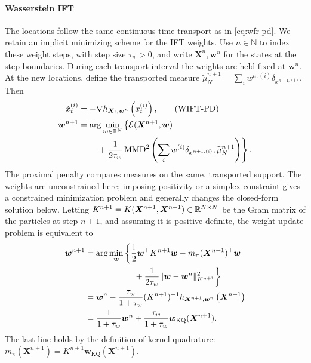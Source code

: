 \paragraph{Wasserstein IFT} 
The locations follow the same continuous-time transport as in \eqref{eq:wfr-pd}. We retain an implicit minimizing scheme for the IFT weights. Use $n\in\mathbb{N}$ to index these weight steps, with step size $\tau_w>0$, and write $\bm{X}^n,\bm{w}^n$ for the states at the step boundaries. During each transport interval the weights are held fixed at $\bm{w}^n$. At the new locations, define the transported measure $\widetilde\mu_N^{n+1}=\sum_iw^{n,(i)}\delta_{x^{n+1,(i)}}$. Then
\begin{align*}\label{eq:wift-pd}
    \dot{x}_t^{(i)}
    &=-\nabla h_{\bm{X}_t,\bm{w}^n}\left(x_t^{(i)}\right), \tag{WIFT-PD} \\
    \bm{w}^{n+1}
    &=\arg\min_{\bm{w}\in\mathbb{R}^N}\left\{
    \mathcal{E}(\bm{X}^{n+1},\bm{w})\right. \\
    &\qquad\left.{}+\frac{1}{2\tau_w}\operatorname{MMD}^2\left(
    \sum_iw^{(i)}\delta_{x^{n+1,(i)}},\widetilde\mu_N^{n+1}\right)\right\}.
\end{align*}
The proximal penalty compares measures on the same, transported support. The weights are unconstrained here; imposing positivity or a simplex constraint gives a constrained minimization problem and generally changes the closed-form solution below.
Letting $K^{n+1}=K(\bm{X}^{n+1},\bm{X}^{n+1})\in\mathbb{R}^{N\times N}$ be the Gram matrix of the particles at step $n+1$, and assuming it is positive definite, the weight update problem is equivalent to
\begin{align*}
    \bm{w}^{n+1}
    &= \arg \min_{\bm{w}} \left\{
    \frac{1}{2} \bm{w}^{\top} K^{n+1} \bm{w}
    - m_\pi(\bm{X}^{n+1})^{\top} \bm{w} \right. \\
    &\hspace{5.6em}\left.{}+ \frac{1}{2 \tau_w}
    \|\bm{w}-\bm{w}^n\|_{K^{n+1}}^2\right\} \\
    &= \bm{w}^n - \frac{\tau_w}{1+\tau_w} (K^{n+1})^{-1}
    h_{\bm{X}^{n+1},\bm{w}^n} \left(\bm{X}^{n+1}\right) \\
    &= \frac{1}{1+\tau_w} \bm{w}^n
    + \frac{\tau_w}{1+\tau_w}
    \bm{w}_{\mathrm{KQ}}(\bm{X}^{n+1}) .
\end{align*} 
The last line holds by the definition of kernel quadrature: $m_\pi(\bm{X}^{n+1}) = K^{n+1} \bm{w}_{\mathrm{KQ}}(\bm{X}^{n+1})$.


